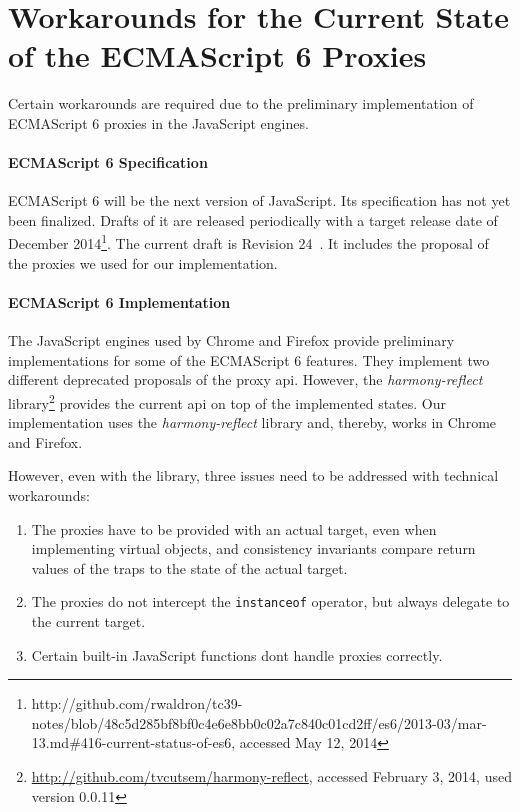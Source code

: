 \section{Workarounds for the Current State of the ECMAScript 6 Proxies} \label{sec:IMPLEMENTATION:4}

Certain workarounds are required due to the preliminary implementation of ECMAScript 6 proxies in the JavaScript engines.

\paragraph{ECMAScript 6 Specification}
ECMAScript 6 will be the next version of JavaScript.
Its specification has not yet been finalized.
Drafts of it are released periodically with a target release date of December 2014\footnote{http://github.com/rwaldron/tc39-notes/blob/48c5d285bf8bf0c4e6e8bb0c02a7c840c01cd2ff/es6/2013-03/mar-13.md\#416-current-status-of-es6, accessed May 12, 2014}.
The current draft is Revision 24~\cite{Ecma2014ES6}.
It includes the proposal of the proxies we used for our implementation.

\paragraph{ECMAScript 6 Implementation}
The JavaScript engines used by Chrome and Firefox provide preliminary implementations for some of the ECMAScript 6 features.
They implement two different deprecated proposals of the proxy \ac{api}.
However, the \emph{harmony-reflect} library\footnote{\url{http://github.com/tvcutsem/harmony-reflect}, accessed February 3, 2014, used version 0.0.11} provides the current \ac{api} on top of the implemented states.
Our implementation uses the \emph{harmony-reflect} library and, thereby, works in Chrome and Firefox.

However, even with the library, three issues need to be addressed with technical workarounds:

\begin{enumerate}
    \item The proxies have to be provided with an actual target, even when implementing virtual objects, and consistency invariants compare return values of the traps to the state of the actual target. 
    \item The proxies do not intercept the \lstinline{instanceof} operator, but always delegate to the current target.
    \item Certain built-in JavaScript functions dont handle proxies correctly.
\end{enumerate}

